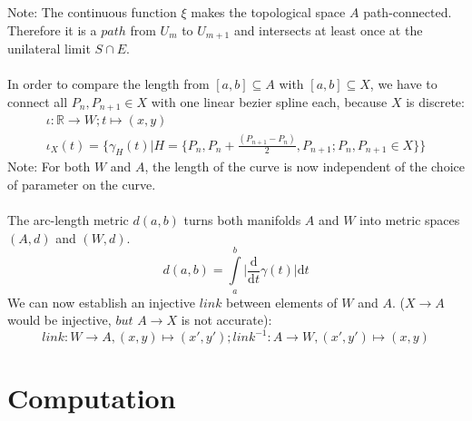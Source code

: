\documentclass{report}
\begin{document}
Note: The continuous function $\xi$ makes the topological space $A$ path-connected. Therefore it is a $path$ from $U_{m}$ to $U_{m+1}$ and intersects at least once at the unilateral limit $S \cap E$. ~\cite[6.1.3.]{Mortad}\\\\
In order to compare the length from $[a,b] \subseteq A$ with $[a,b] \subseteq X$, we have to connect all $P_{n}, P_{n+1} \in X$ with one linear bezier spline each, because $X$ is discrete:
\begin{align}
\iota: \mathbb{R} \rightarrow W; t \mapsto (x,y)\\
\iota_{X}(t) = \{ \gamma_{H}(t)\lvert H=\{P_{n},P_{n}+\frac{(P_{n+1}-P_{n})}{2},P_{n+1}; P_{n}, P_{n+1} \in X\}\}
\end{align}
Note: For both $W$ and $A$, the length of the curve is now independent of the choice of parameter on the curve. ~\cite[1.1]{Taimanov}\\\\
The arc-length metric $d(a,b)$ turns both manifolds $A$ and $W$ into metric spaces $(A,d)$ and $(W,d)$. ~\cite[1.1.3]{Klingenberg}
\begin{equation}
d(a,b) = \int \limits _{a}^{b}\lvert \frac{\mathrm{d}}{\mathrm{d}t}\gamma(t)\rvert \mathrm{d}t\label{eq:1}
\end{equation}
We can now establish an injective $link$ between elements of $W$ and $A$. ($X \rightarrow A$ would be injective, $but$ $A \rightarrow X$ is not accurate):
\begin{equation}
link: W \rightarrow A, (x,y) \mapsto (x',y'); link^{-1}: A \rightarrow W, (x',y') \mapsto (x,y)
\end{equation}

\chapter{Computation}
\end{document}

